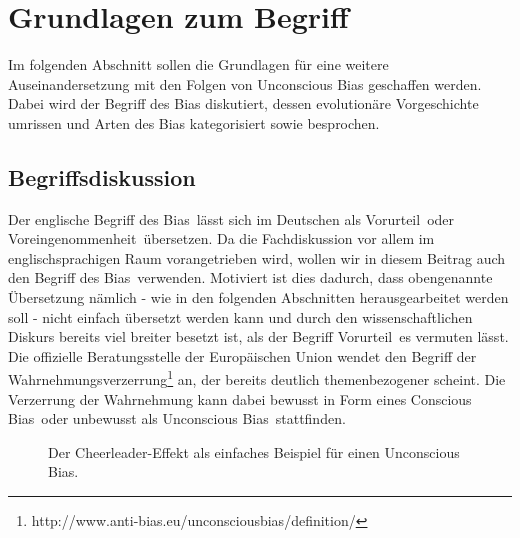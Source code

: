 \newpage
\section{Grundlagen zum Begriff}
Im folgenden Abschnitt sollen die Grundlagen für eine weitere Auseinandersetzung mit den Folgen von Unconscious Bias geschaffen werden. Dabei wird der Begriff des Bias diskutiert, dessen evolutionäre Vorgeschichte umrissen und Arten des Bias kategorisiert sowie besprochen.\\

\subsection{Begriffsdiskussion}
Der englische Begriff des \glqq Bias\grqq~lässt sich im Deutschen als \glqq Vorurteil\grqq~oder \glqq Voreingenommenheit\grqq~übersetzen. Da die Fachdiskussion vor allem im englischsprachigen Raum vorangetrieben wird, wollen wir in diesem Beitrag auch den Begriff des \glqq Bias\grqq~verwenden. Motiviert ist dies dadurch, dass obengenannte Übersetzung nämlich - wie in den folgenden Abschnitten herausgearbeitet werden soll - nicht einfach übersetzt werden kann und durch den wissenschaftlichen Diskurs bereits viel breiter besetzt ist, als der Begriff \glqq Vorurteil\grqq~es vermuten lässt. \\

Die offizielle Beratungsstelle der Europäischen Union wendet den Begriff der \glqq Wahrnehmungsverzerrung\grqq\footnote{http://www.anti-bias.eu/unconsciousbias/definition/} an, der bereits deutlich themenbezogener scheint. Die Verzerrung der Wahrnehmung kann dabei bewusst in Form eines \glqq Conscious Bias\grqq~oder unbewusst als \glqq Unconscious Bias\grqq~stattfinden.

\begin{figure}[htbp]
\caption{Der Cheerleader-Effekt als einfaches Beispiel für einen Unconscious Bias.}
\label{fig:beispiel-unconscious-bias}
\end{figure}

